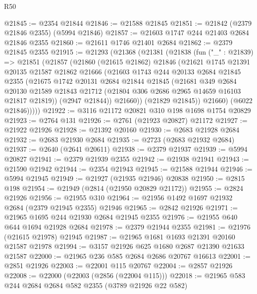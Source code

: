 \begin{lexlean}{R50}
\begin{coremodule}
@21845 := @2354 @21844
@21846 := @21588 @21845
@21851 := @21842 (@2379 @21846 @2355) (@5994 @21846)
@21857 := @21603 @1747 @244 @21403 @2684 @21846 @2355
@21860 := @21611 @1746 @21401 @2684
@21862 := @2379 @21845 @2355
@21915 := @21293
    (@21368
      (@21381
        (@21838
          (fun ("_" : @21839) =>
          @21851
            (@21857
              (@21860
                (@21615 @21862)
                @21846
                (@21621
                  @1745
                  @21391
                  @20135
                  @21587
                  @21862
                  @21666
                  (@21603
                    @1743
                    @244
                    @20133
                    @2684
                    @21845
                    @2355
                    (@21675
                      @1742
                      @20131
                      @2684
                      @21844
                      @21845
                      (@21681
                        @349
                        @2684
                        @20130
                        @21589
                        @21843
                        @21712
                        (@21804 @306 @2686 @2965 @14659 @16103 @21817 @21819))
                      (@2947 @21844))
                    @21660))
                (@21829 @21845))
              @21660)
            (@6022 @21846)))))
@21922 := @3116 @21172 @20821 @310 @198 @1698 @1754 @20829
@21923 := @2764 @131
@21926 := @2761 (@21923 @20827) @21172
@21927 := @21922 @21926
@21928 := @21392 @20160
@21930 := @2683 @21928 @2684
@21932 := @2683 @21930 @2684
@21935 := @2723 (@2683 @21932 @2684)
@21937 := @2640 (@2641 @20611)
@21938 := @2379 @21937
@21939 := @5994 @20827
@21941 := @2379 @21939 @2355
@21942 := @21938 @21941
@21943 := @21590 @21942
@21944 := @2354 @21943
@21945 := @21588 @21944
@21946 := @5994 @21945
@21949 := @21927 (@21935 @21946) @20838
@21950 := @2815 @198
@21954 := @21949 (@2814 (@21950 @20829 @21172))
@21955 := @2824 @21926
@21956 := @21955 @310
@21964 := @21956 @1492 @1697 @21932 @2684 (@2379 @21945 @2355) @21946
@21965 := @2842 @21926
@21971 := @21965 @1695 @244 @21930 @2684 @21945 @2355
@21976 := @21955 @640 @644 @1694 @21928 @2684
@21978 := @2379 @21944 @2355
@21981 := @21976 (@21615 @21978) @21945
@21987 := @21965 @1681 @1693 @21391 @20160 @21587 @21978
@21994 := @3157 @21926 @625 @1680 @2687 @21390 @21633 @21587
@22000 := @21965 @236 @585 @2684 @2686 @20767 @16613
@22001 := @2851 @21926
@22003 := @22001 @115 @20767
@22004 := @2857 @21926
@22008 := @22000 (@22003 (@2856 (@22004 @115)))
@22018 := @21965 @583 @244 @2684 @2684 @582 @2355 (@3789 @21926 @22 @582)

\end{coremodule}
\end{lexlean}
